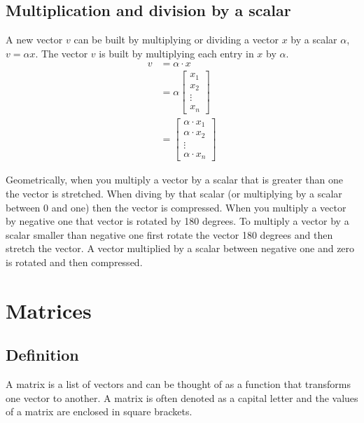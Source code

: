 \subsection{Multiplication and division by a scalar}

A new vector $v$ can be built by multiplying or dividing a vector $x$ by a scalar $\alpha$, $v = \alpha x$. 
The vector $v$ is built by multiplying each entry in $x$ by $\alpha$. 
\begin{align}
    v &= \alpha \cdot x\\
      &= \alpha \begin{bmatrix}
                  x_{1}\\
                  x_{2}\\
                  \vdots\\
                  x_{n}
      \end{bmatrix}\\
      &= \begin{bmatrix}
                  \alpha \cdot x_{1}\\
                  \alpha \cdot x_{2}\\
                  \vdots\\
                  \alpha \cdot x_{n}
      \end{bmatrix}
\end{align}

Geometrically, when you multiply a vector by a scalar that is greater than one the vector is stretched. 
When diving by that scalar (or multiplying by a scalar between 0 and one) then the vector is compressed. 
When you multiply a vector by negative one that vector is rotated by 180 degrees.
To multiply a vector by a scalar smaller than negative one first rotate the vector 180 degrees and then stretch the vector. A vector multiplied by a scalar between negative one and zero is rotated and then compressed.   

\section{ Matrices }
\hspace{1mm}
\subsection{Definition}
A matrix is a list of vectors and can be thought of as a function that transforms one vector to another. 
A matrix is often denoted as a capital letter and the values of a matrix are enclosed in square brackets. 

